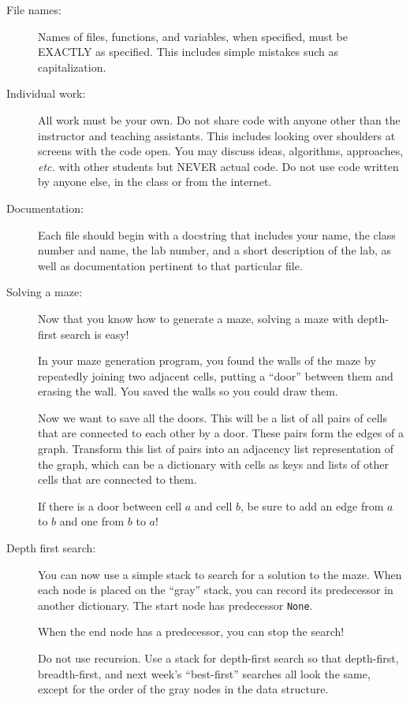 \documentclass{article}
\begin{document}
\begin{description}

\item[File names:]  Names of files, functions, and variables, 
when specified,
must be EXACTLY as specified.  This includes simple mistakes such
as capitalization.

\item[Individual work:]  All work must be your own.  Do not share
code with anyone other than the instructor and teaching assistants.
This includes looking over shoulders at screens with the code open.
You may discuss ideas, algorithms, approaches, {\em etc.} with
other students but NEVER actual code.  Do not use code
written by anyone else, in the class or from the internet.

\item[Documentation:] Each file should begin with a docstring
that includes your name, the class number and name, the lab
number, and  
a short description of the lab, as well as documentation pertinent
to that particular file.

  
\item[Solving a maze:]  Now that you know how to generate a maze,
solving a maze with depth-first search is easy!

In your maze generation program, you found the walls of the maze
by repeatedly joining two adjacent cells, putting a ``door'' between
them and erasing the wall.  You saved the walls so you could draw 
them.

Now we want to save all the doors.  This will be a list of all pairs
of cells that are connected to each other by a door.  These
pairs form the edges of a graph.  Transform
this list of pairs into an adjacency list representation of the graph,
which can be a dictionary with cells as keys and lists of other
cells that are connected to them.

If there is a door between cell $a$ and cell $b$, be sure to 
add an edge from $a$ to $b$ and one from $b$ to $a$!

\item[Depth first search:]  You can now use a simple stack
to search for a solution to the maze.  When each node is
placed on the ``gray'' stack, you can record its predecessor
in another dictionary.  The start node has predecessor {\tt None}.

When the end node has a predecessor, you can stop
the search!

Do not use recursion.  Use a stack for depth-first search
so that depth-first, breadth-first, and next week's ``best-first''
searches all look the same, except for the order of
the gray nodes in the data structure.


\end{description}
\end{document}

